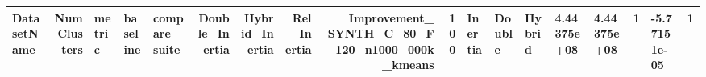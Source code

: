 \begin{tabular}{lrlllrrrrr}
\toprule
DatasetName & NumClusters & metric & baseline & compare_suite & Double_Inertia & Hybrid_Inertia & Rel_Inertia & Improvement_%
\midrule
SYNTH_C_80_F_120_n1000_000k_kmeans & 100 & Inertia & Double & Hybrid & 4.44375e+08 & 4.44375e+08 & 1 & -5.77151e-05 & 1 \\
\bottomrule
\end{tabular}
